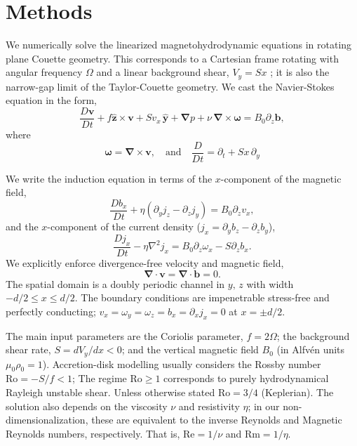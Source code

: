 \documentclass[openacc]{rsproca_new}%
\newcommand{\Reyn}{\mathrm{Re}}
\newcommand{\Reym}{\mathrm{Rm}}
\newcommand{\Ro}{\mathrm{Ro}}
\begin{document}
\section{Methods}
\label{sec:methods}

We numerically solve the linearized magnetohydrodynamic equations in rotating plane Couette geometry.
This corresponds to a Cartesian frame rotating with angular frequency $\Omega$ and a linear background shear, $V_{y}=Sx$ \cite{2015RSPSA.47140699V}; it is also the narrow-gap limit of the Taylor-Couette geometry.
We cast the Navier-Stokes equation in the form,
\begin{equation}\label{eq:mhd}
\frac{D \boldsymbol{v}}{Dt}+f \boldsymbol{\hat{z}}\times\boldsymbol{v}+{S}v_{x}\,\boldsymbol{\hat{y}}+\boldsymbol{\nabla}{p}+\nu\,\boldsymbol{\nabla}\times\boldsymbol{\omega}=B_{0}\partial_{z}\boldsymbol{b},
\end{equation}
where
\begin{equation}
\boldsymbol{\omega}=\boldsymbol{\nabla}\times\boldsymbol{v},\quad\text{and}\quad\frac{D}{Dt}=\partial_{t}+{S}x\,\partial_{y}\end{equation}

We write the induction equation in terms of the $x$-component of the magnetic field,
\begin{equation}\label{eq:Bx}
\frac{Db_{x}}{Dt}+\eta(\partial_{y}j_{z}-\partial_{z}j_{y})=B_{0}\partial_{z}v_{x},
\end{equation}
and the $x$-component of the current density ($j_{x}=\partial_{y}b_{z}-\partial_{z}b_{y}$),
\begin{equation}\label{eq:Jx}
\frac{Dj_{x}}{Dt}-\eta\nabla^{2}j_{x}=B_{0}\partial_{z}\omega_{x}-S\partial_{z}b_{x}.
\end{equation}
We explicitly enforce divergence-free velocity and magnetic field,
\begin{equation}\label{eq:divu}
 \boldsymbol{\nabla}\cdot\boldsymbol{v}=\boldsymbol{\nabla}\cdot\boldsymbol{b}=0.
\end{equation}
The spatial domain is a doubly periodic channel in $y,\,z$ with width $-d/2\le{x}\le d/2$.
The boundary conditions are impenetrable stress-free and perfectly conducting; $v_{x}=\omega_{y}=\omega_{z}=b_{x}=\partial_{x}j_{x}=0$ at $x=\pm{d/2}$. 

The main input parameters are the Coriolis parameter, $f=2 \Omega$; the background shear rate, $S=dV_{y}/dx<0$; and the vertical magnetic field $B_{0}$ (in Alfv\'{e}n units $\mu_{0}\rho_{0}=1$).
Accretion-disk modelling usually considers the Rossby number $\Ro=-S/f<1$; The regime $\Ro\ge1$ corresponds to purely hydrodynamical Rayleigh unstable shear.
Unless otherwise stated $\Ro=3/4$ (Keplerian).
The solution also depends on the viscosity $\nu$ and resistivity $\eta$; in our non-dimensionalization, these are equivalent to the inverse Reynolds and Magnetic Reynolds numbers, respectively.
That is, $\Reyn = 1/\nu$ and $\Reym = 1/\eta$.
\end{document}
